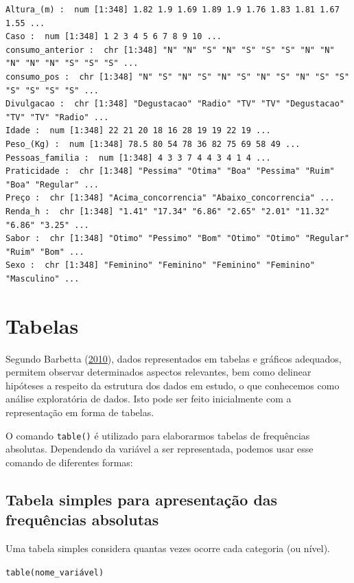 \documentclass[12pt,brazil,oneside]{book}
\begin{document}
\begin{verbatim}
Altura_(m) :  num [1:348] 1.82 1.9 1.69 1.89 1.9 1.76 1.83 1.81 1.67 1.55 ...
Caso :  num [1:348] 1 2 3 4 5 6 7 8 9 10 ...
consumo_anterior :  chr [1:348] "N" "N" "S" "N" "S" "S" "S" "N" "N" "N" "N" "N" "S" "S" "S" ...
consumo_pos :  chr [1:348] "N" "S" "N" "S" "N" "S" "N" "S" "N" "S" "S" "S" "S" "S" "S" ...
Divulgacao :  chr [1:348] "Degustacao" "Radio" "TV" "TV" "Degustacao" "TV" "TV" "Radio" ...
Idade :  num [1:348] 22 21 20 18 16 28 19 19 22 19 ...
Peso_(Kg) :  num [1:348] 78.5 80 54 78 36 82 75 69 58 49 ...
Pessoas_familia :  num [1:348] 4 3 3 7 4 4 3 4 1 4 ...
Praticidade :  chr [1:348] "Pessima" "Otima" "Boa" "Pessima" "Ruim" "Boa" "Regular" ...
Preço :  chr [1:348] "Acima_concorrencia" "Abaixo_concorrencia" ...
Renda_h :  chr [1:348] "1.41" "17.34" "6.86" "2.65" "2.01" "11.32" "6.86" "3.25" ...
Sabor :  chr [1:348] "Otimo" "Pessimo" "Bom" "Otimo" "Otimo" "Regular" "Ruim" "Bom" ...
Sexo :  chr [1:348] "Feminino" "Feminino" "Feminino" "Feminino" "Masculino" ...
\end{verbatim}

\hypertarget{tabelas}{%
\section{Tabelas}\label{tabelas}}

Segundo Barbetta (\protect\hyperlink{ref-barbetta1988}{2010}), dados representados em tabelas e gráficos adequados, permitem observar determinados aspectos relevantes, bem como delinear hipóteses a respeito da estrutura dos dados em estudo, o que conhecemos como análise exploratória de dados. Isto pode ser feito inicialmente com a representação em forma de tabelas.

O comando \texttt{table()} é utilizado para elaborarmos tabelas de frequências absolutas. Dependendo da variável a ser representada, podemos usar esse comando de diferentes formas:

\hypertarget{tabela-simples-para-apresentacao-das-frequencias-absolutas}{%
\subsection{Tabela simples para apresentação das frequências absolutas}\label{tabela-simples-para-apresentacao-das-frequencias-absolutas}}

Uma tabela simples considera quantas vezes ocorre cada categoria (ou nível).

\texttt{table(nome\_variável)}
\end{document}
